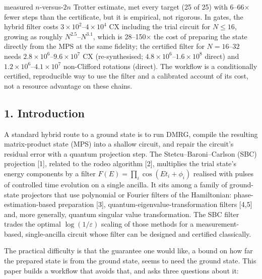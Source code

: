 \documentclass[
]{article}
\begin{document}
measured \(n\)-versus-\(2n\) Trotter estimate, met every target (25 of
25) with 6--66\(\times\) fewer steps than the certificate, but it is
empirical, not rigorous. In gates, the hybrid filter costs
\(3\times10^{2}\)--\(4\times10^{4}\) CX including the trial circuit for
\(N\le16\), growing as roughly \(N^{2.5}\)--\(N^{3.1}\), which is
28--150\(\times\) the cost of preparing the state directly from the MPS
at the same fidelity; the certified filter for \(N=16\)--\(32\) needs
\(2.8\times10^{6}\)--\(9.6\times10^{7}\) CX (re-synthesised;
\(4.8\times10^{6}\)--\(1.6\times10^{8}\) direct) and
\(1.2\times10^{6}\)--\(4.1\times10^{7}\) non-Clifford rotations
(direct). The workflow is a conditionally certified, reproducible way to
use the filter and a calibrated account of its cost, not a resource
advantage on these chains.

\hypertarget{introduction}{%
\subsection{1. Introduction}\label{introduction}}

A standard hybrid route to a ground state is to run DMRG, compile the
resulting matrix-product state (MPS) into a shallow circuit, and repair
the circuit's residual error with a quantum projection step. The
Stetcu--Baroni--Carlson (SBC) projection {[}1{]}, related to the rodeo
algorithm {[}2{]}, multiplies the trial state's energy components by a
filter \(F(E)=\prod_i\cos(Et_i+\phi_i)\) realised with pulses of
controlled time evolution on a single ancilla. It sits among a family of
ground-state projectors that use polynomial or Fourier filters of the
Hamiltonian: phase-estimation-based preparation {[}3{]},
quantum-eigenvalue-transformation filters {[}4,5{]} and, more generally,
quantum singular value transformation. The SBC filter trades the optimal
\(\log(1/\varepsilon)\) scaling of those methods for a
measurement-based, single-ancilla circuit whose filter can be designed
and certified classically.

The practical difficulty is that the guarantee one would like, a bound
on how far the prepared state is from the ground state, seems to need
the ground state. This paper builds a workflow that avoids that, and
asks three questions about it:
\end{document}
